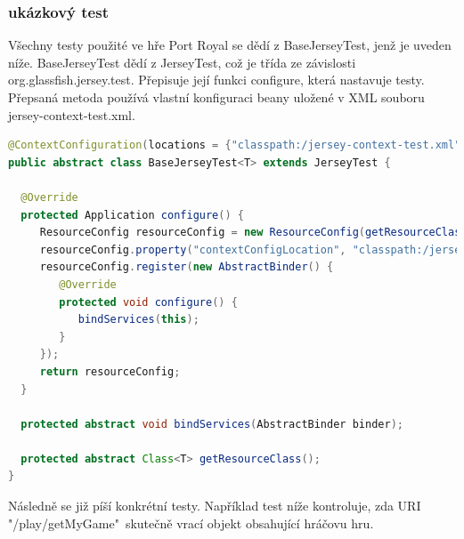 \documentclass[czech,master,public,dept460,male,cpdeclaration,twoside]{diploma}
\begin{document}
\subsubsection{ukázkový test}
Všechny testy použité ve hře Port Royal se dědí z BaseJerseyTest, jenž je uveden níže. BaseJerseyTest dědí z JerseyTest, což je třída ze závislosti org.glassfish.jersey.test. Přepisuje její funkci configure, která nastavuje testy. Přepsaná metoda používá vlastní  konfiguraci beany uložené v XML souboru jersey-context-test.xml.
\begin{lstlisting}[language=Java, caption=BaseJerseyTest]
@ContextConfiguration(locations = {"classpath:/jersey-context-test.xml"})
public abstract class BaseJerseyTest<T> extends JerseyTest {

  @Override
  protected Application configure() {
     ResourceConfig resourceConfig = new ResourceConfig(getResourceClass());
     resourceConfig.property("contextConfigLocation", "classpath:/jersey-context-test.xml");
     resourceConfig.register(new AbstractBinder() {
        @Override
        protected void configure() {
           bindServices(this);
        }
     });
     return resourceConfig;
  }
  
  protected abstract void bindServices(AbstractBinder binder);

  protected abstract Class<T> getResourceClass();
}
\end{lstlisting}

Následně se již píší konkrétní testy. Například test níže kontroluje, zda URI "/play/getMyGame"~skutečně vrací objekt obsahující hráčovu hru.
\end{document}
